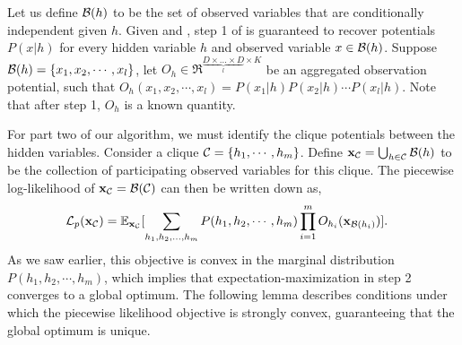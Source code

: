 Let us define $\mathcal{B}(h)$ to be the set of observed variables that
  are conditionally independent given $h$. 
Given  and , step
  1 of  is guaranteed to recover potentials
  $P(x|h)$ for every hidden variable $h$ and observed variable $x \in
  \mathcal{B}(h)$.
Suppose $\mathcal{B}(h) = \{x_1, x_2, \cdots, x_l\}$, let $O_h \in
  \Re^{\underbrace{D \times \ldots \times D}_{l} \times K}$ be an
  aggregated observation potential, such that $O_h(x_1, x_2, \cdots,
  x_l) = P(x_1|h) P(x_2|h) \cdots P(x_l|h)$.
Note that after step 1, $O_h$ is a known quantity.

For part two of our algorithm, we must identify the clique potentials between the
  hidden variables. 
Consider a clique $\mathcal{C} = \{h_1, \cdots, h_m\}$. 
Define $\mathbf{x}_{\mathcal{C}} = \bigcup_{h \in \mathcal{C}} \mathcal{B}(h)$ to be the collection of
  participating observed variables for this clique.
The piecewise log-likelihood of $\mathbf{x}_{\mathcal{C}} =\mathcal{B}(\mathcal{C})$ can then be
  written down as,
\begin{align}
  \mathcal{L}_p(\mathbf{x}_{\mathcal{C}}) 
    &= \mathbb{E}_{\mathbf{x}_{\mathcal{C}}}[ \sum_{h_1, h_2, \ldots, h_m} P(h_1, h_2, \cdots, h_m) 
    \prod_{i=1}^{m} O_{h_i}(\mathbf{x}_{\mathcal{B}(h_i)}) ]. \label{eqn:piecewise}
\end{align}
As we saw earlier, this objective is convex in the marginal distribution
  $P(h_1, h_2, \cdots, h_m)$, which implies that
  expectation-maximization in step 2 converges to a global optimum.
The following lemma describes conditions under which the piecewise
  likelihood objective is strongly convex, guaranteeing that the global
  optimum is unique.

